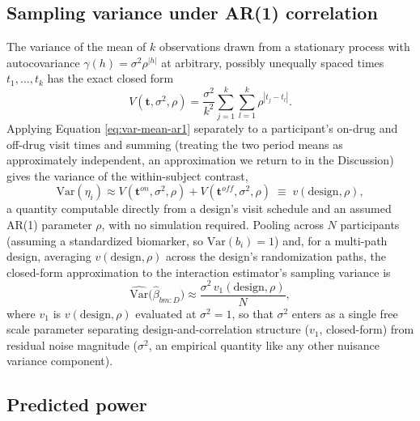 \documentclass[
  11pt,
]{article}
\begin{document}
\subsection{Sampling variance under AR(1) correlation}\label{sampling-variance-under-ar1-correlation}

The variance of the mean of \(k\) observations drawn from a stationary
process with autocovariance \(\gamma(h) = \sigma^2\rho^{|h|}\) at
arbitrary, possibly unequally spaced times \(t_1,\dots,t_k\) has the
exact closed form
\begin{equation}
V(\mathbf{t}, \sigma^2, \rho) = \frac{\sigma^2}{k^2}
  \sum_{j=1}^{k}\sum_{l=1}^{k} \rho^{|t_j - t_l|}.
\label{eq:var-mean-ar1}
\end{equation}
Applying Equation \eqref{eq:var-mean-ar1} separately to a
participant's on-drug and off-drug visit times and summing (treating
the two period means as approximately independent, an approximation
we return to in the Discussion) gives the variance of the
within-subject contrast,
\begin{equation}
\mathrm{Var}(\eta_i) \approx V(\mathbf{t}^{on}, \sigma^2, \rho) +
  V(\mathbf{t}^{off}, \sigma^2, \rho) \;\equiv\; v(\mathrm{design},
  \rho),
\label{eq:v-sum}
\end{equation}
a quantity computable directly from a design's visit schedule and an
assumed AR(1) parameter \(\rho\), with no simulation required. Pooling
across \(N\) participants (assuming a standardized biomarker, so
\(\mathrm{Var}(b_i)=1\)) and, for a multi-path design, averaging
\(v(\mathrm{design},\rho)\) across the design's randomization paths,
the closed-form approximation to the interaction estimator's sampling
variance is
\begin{equation}
\widehat{\mathrm{Var}}\big(\hat\beta_{bm:D}\big) \approx
  \frac{\sigma^2\, v_1(\mathrm{design},\rho)}{N},
\label{eq:var-closed-form}
\end{equation}
where \(v_1\) is \(v(\mathrm{design},\rho)\) evaluated at \(\sigma^2=1\), so
that \(\sigma^2\) enters as a single free scale parameter separating
design-and-correlation structure (\(v_1\), closed-form) from residual
noise magnitude (\(\sigma^2\), an empirical quantity like any other
nuisance variance component).

\subsection{Predicted power}\label{predicted-power}
\end{document}
